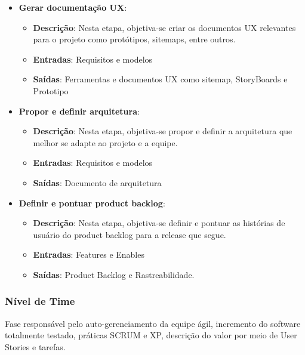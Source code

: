 \begin{itemize}
  \item \textbf{Gerar documentação UX}:
  \begin{itemize}
    \item \textbf{Descrição}: Nesta etapa, objetiva-se criar os documentos UX relevantes para o projeto como
      protótipos, sitemaps, entre outros.
    \item \textbf{Entradas}: Requisitos e modelos
    \item \textbf{Saídas}: Ferramentas e documentos UX como sitemap, StoryBoards e Prototipo
  \end{itemize}
  \newpage
  \item \textbf{Propor e definir arquitetura}:
  \begin{itemize}
    \item \textbf{Descrição}: Nesta etapa, objetiva-se propor e definir a arquitetura que melhor se adapte ao projeto
      e a equipe.
    \item \textbf{Entradas}: Requisitos e modelos
    \item \textbf{Saídas}: Documento de arquitetura
  \end{itemize}
  \item \textbf{Definir e pontuar product backlog}:
  \begin{itemize}
    \item \textbf{Descrição}: Nesta etapa, objetiva-se definir e pontuar as histórias de usuário do product backlog
      para a release que segue.
    \item \textbf{Entradas}: Features e Enables
    \item \textbf{Saídas}: Product Backlog e Rastreabilidade.
  \end{itemize}
\end{itemize}

\subsubsection{Nível de Time}

Fase responsável pelo auto-gerenciamento da equipe ágil, incremento do software totalmente testado, práticas SCRUM e XP, descrição do valor por meio de User Stories e tarefas.

